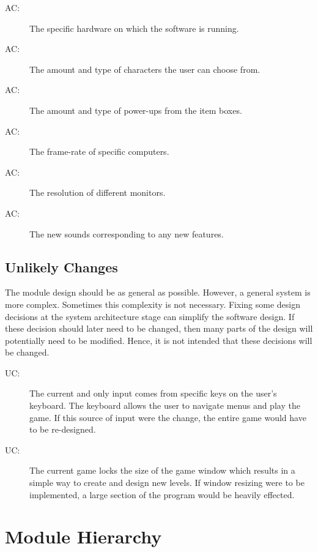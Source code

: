 \documentclass[12pt, titlepage]{article}
\newcounter{acnum}
\newcommand{\actheacnum}{AC\theacnum}
\newcounter{ucnum}
\newcommand{\uctheucnum}{UC\theucnum}
\begin{document}
\begin{description}
\item[ \actheacnum \label{acHardware}:] The specific hardware on which the software is running.
\item[ \actheacnum \label{acCharacters}:] The amount and type of characters the user can choose from. 
\item[ \actheacnum \label{acPower}:] The amount and type of power-ups from the item boxes.
\item[ \actheacnum \label{acSpeed}:] The frame-rate of specific computers.
\item[ \actheacnum \label{acRes}:] The resolution of different monitors.
\item[ \actheacnum \label{acSound}:] The new sounds corresponding to any new features.
\end{description}

\subsection{Unlikely Changes} \label{SecUchange}

The module design should be as general as possible. However, a general system is
more complex. Sometimes this complexity is not necessary. Fixing some design
decisions at the system architecture stage can simplify the software design. If
these decision should later need to be changed, then many parts of the design
will potentially need to be modified. Hence, it is not intended that these
decisions will be changed.

\begin{description}
\item[ \uctheucnum \label{ucIO}:] The current and only input comes from specific keys on the user's keyboard. The keyboard allows the user to navigate menus and play the game. If this source of input were the change, the entire game would have to be re-designed.
\item[ \uctheucnum \label{ucWindow}:] The current game locks the size of the game window which results in a simple way to create and design new levels. If window resizing were to be implemented, a large section of the program would be heavily effected.
\end{description}

\section{Module Hierarchy} \label{SecMH}
\end{document}
